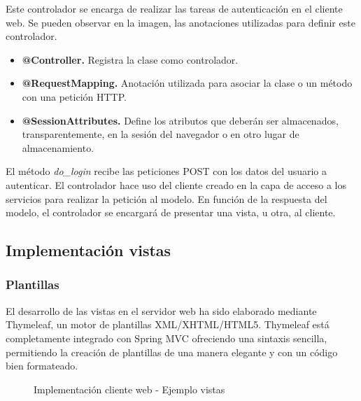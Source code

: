 Este controlador se encarga de realizar las tareas de autenticación en el cliente web. Se pueden observar en la imagen, las anotaciones utilizadas para definir este controlador.

\begin{itemize}
	\item \textbf{@Controller. }Registra la clase como controlador.
	\item \textbf{@RequestMapping. }Anotación utilizada para asociar la clase o un método con una petición HTTP.
	\item \textbf{@SessionAttributes. }Define los atributos que deberán ser almacenados, transparentemente, en la sesión del navegador o en otro lugar de almacenamiento.
\end{itemize}

El método \textit{do\_login} recibe las peticiones POST con los datos del usuario a autenticar. El controlador hace uso del cliente creado en la capa de acceso a los servicios para realizar la petición al modelo. En función de la respuesta del modelo, el controlador se encargará de presentar una vista, u otra, al cliente.


\subsection{Implementación vistas}

\subsubsection*{Plantillas}

El desarrollo de las vistas en el servidor web ha sido elaborado mediante Thymeleaf, un motor de plantillas XML/XHTML/HTML5. Thymeleaf está completamente integrado con Spring MVC ofreciendo una sintaxis sencilla, permitiendo  la creación de plantillas de una manera elegante y con un código bien formateado.

\begin{figure}[H]
\centering
{}
\caption{Implementación cliente web - Ejemplo vistas}
\end{figure}

